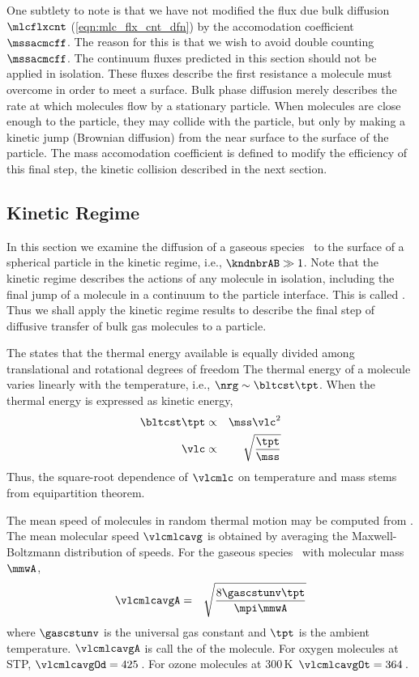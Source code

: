\documentclass[12pt,twoside]{book}
\begin{document}
One subtlety to note is that we have not modified the flux due
bulk diffusion $\mlcflxcnt$ (\ref{eqn:mlc_flx_cnt_dfn}) by the
accomodation coefficient $\mssacmcff$. 
The reason for this is that we wish to avoid double counting 
$\mssacmcff$. 
The continuum fluxes predicted in this section should not be applied
in isolation.
These fluxes describe the first resistance a molecule must overcome in
order to meet a surface.
Bulk phase diffusion merely describes the rate at which molecules flow
by a stationary particle.
When molecules are close enough to the particle, they may collide with
the particle, but only by making a kinetic jump (Brownian diffusion)
from the near surface to the surface of the particle.
The mass accomodation coefficient is defined to modify the efficiency
of this final step, the kinetic collision described in the next
section. 

\subsection[Kinetic Regime]{Kinetic Regime}\label{sxn:knt}
In this section we examine the diffusion of a gaseous species \A\ to 
the surface of a spherical particle in the kinetic regime, i.e.,
$\kndnbrAB \gg 1$.
Note that the kinetic regime describes the actions of any molecule in
isolation, including the final jump of a molecule in a continuum to
the particle interface.
This is called .
Thus we shall apply the kinetic regime results to describe the final
step of diffusive transfer of bulk gas molecules to a particle.

The  states that the thermal energy
available is equally divided among translational and rotational
degrees of freedom %
The thermal energy of a molecule varies linearly with the temperature,
i.e., $\nrg \sim \bltcst \tpt$.
When the thermal energy is expressed as kinetic energy,
\begin{eqnarray}
\bltcst \tpt & \propto & \mss \vlc^{2} \nonumber \\
\vlc & \propto & \sqrt{ \frac{\tpt}{\mss } }
\label{eqn:vlc_tpt_dfn}
\end{eqnarray}
Thus, the square-root dependence of $\vlcmlc$ on temperature and mass
stems from equipartition theorem.

The mean speed of molecules in random thermal motion may be computed
from . 
The mean molecular speed $\vlcmlcavg$ is obtained by averaging the 
Maxwell-Boltzmann distribution of speeds.
For the gaseous species \A\ with molecular mass $\mmwA$, 
\begin{eqnarray}
\vlcmlcavgA & = & \sqrt{\frac{8 \gascstunv \tpt}{\mpi \mmwA}}
\label{eqn:vlc_mlc_avg_dfn}
\end{eqnarray}
where $\gascstunv$ is the universal gas constant and $\tpt$ is the
ambient temperature. 
$\vlcmlcavgA$ is call the  of the molecule.
For oxygen molecules at STP, $\vlcmlcavgOd = 425$\,\mxs.
For ozone molecules at 300\,K\, $\vlcmlcavgOt = 364$\,\mxs.
\end{document}
